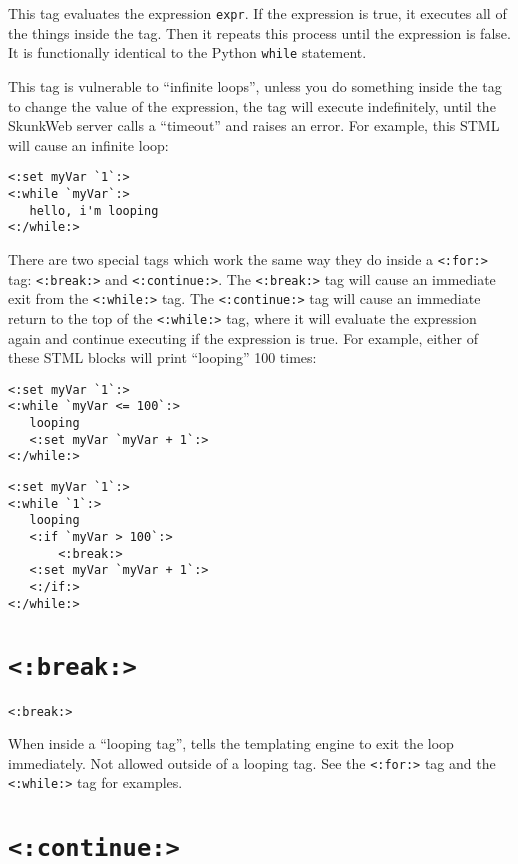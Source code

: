 \documentclass{manual}
\begin{document}
This tag evaluates the expression \texttt{expr}. If the expression
is true, it executes all of the things inside the tag. Then it
repeats this process until the expression is false. It is functionally
identical to the Python \texttt{while} statement.

This tag is vulnerable to ``infinite loops'', unless you do something
inside the tag to change the value of the expression, the tag will
execute indefinitely, until the SkunkWeb server calls a ``timeout'' and
raises an error. For example, this STML will cause an infinite loop:

\begin{verbatim}
<:set myVar `1`:>
<:while `myVar`:>
   hello, i'm looping
<:/while:>
\end{verbatim}

There are two special tags which work the same way they do inside
a \texttt{<:for:>} tag: \texttt{<:break:>} and 
\texttt{<:continue:>}. The \texttt{<:break:>} tag will
cause an immediate exit from the \texttt{<:while:>} tag.
The \texttt{<:continue:>} tag will cause an immediate return
to the top of the \texttt{<:while:>} tag, where it will
evaluate the expression again and continue executing if the expression
is true. For example, either of these STML blocks will print 
``looping'' 100 times:

\begin{verbatim}
<:set myVar `1`:>
<:while `myVar <= 100`:>
   looping
   <:set myVar `myVar + 1`:>
<:/while:>
\end{verbatim}

\begin{verbatim}
<:set myVar `1`:>
<:while `1`:>
   looping
   <:if `myVar > 100`:>
       <:break:>
   <:set myVar `myVar + 1`:>
   <:/if:>
<:/while:>
\end{verbatim}


\section{\texttt{<:break:>}}
\label{tagbreak}

\begin{verbatim}<:break:>\end{verbatim}

When inside a ``looping tag'', tells the templating engine to exit
the loop immediately. Not allowed outside of a looping tag.
See the \texttt{<:for:>}  tag
and the \texttt{<:while:>}  tag
for examples.


\section{\texttt{<:continue:>}}
\label{tagcontinue}
\end{document}
